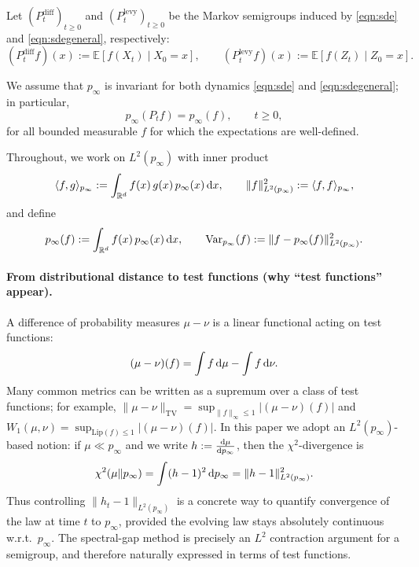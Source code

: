 \begin{definition}
    Let $(P_t^{\mathrm{diff}})_{t\ge 0}$ and $(P_t^{\mathrm{levy}})_{t\ge 0}$ be the Markov semigroups induced by
\eqref{eqn:sde} and \eqref{eqn:sdegeneral}, respectively:
\[
(P_t^{\mathrm{diff}}f)(x):=\mathbb{E}[f(X_t)\mid X_0=x],
\qquad
(P_t^{\mathrm{levy}}f)(x):=\mathbb{E}[f(Z_t)\mid Z_0=x].
\]
\end{definition}

We assume that $p_\infty$ is invariant for both dynamics \eqref{eqn:sde} and \eqref{eqn:sdegeneral}; in particular,
\begin{equation}\label{eq:pinfty_invariant}
p_\infty(P_t f)=p_\infty(f),\qquad t\ge 0,
\end{equation}
for all bounded measurable $f$ for which the expectations are well-defined.

Throughout, we work on $L^2(p_\infty)$ with inner product
\[
\langle f,g\rangle_{p_\infty}:=\int_{\mathbb{R}^d} f(x)\,g(x)\,p_\infty(x)\,\mathrm{d} x,
\qquad
\|f\|_{L^2(p_\infty)}^2:=\langle f,f\rangle_{p_\infty},
\]
and define
\[
p_\infty(f):=\int_{\mathbb{R}^d} f(x)\,p_\infty(x)\,\mathrm{d} x,
\qquad
\mathrm{Var}_{p_\infty}(f):=\|f-p_\infty(f)\|_{L^2(p_\infty)}^2.
\]

\paragraph{From distributional distance to test functions (why ``test functions'' appear).}
A difference of probability measures $\mu-\nu$ is a linear functional acting on test functions:
\[
(\mu-\nu)(f)=\int f\,\mathrm{d}\mu-\int f\,\mathrm{d}\nu.
\]
Many common metrics can be written as a supremum over a class of test functions; for example,
$\|\mu-\nu\|_{\mathrm{TV}}=\sup_{\|f\|_\infty\le 1}|(\mu-\nu)(f)|$ and
$W_1(\mu,\nu)=\sup_{\mathrm{Lip}(f)\le 1}|(\mu-\nu)(f)|$.
In this paper we adopt an $L^2(p_\infty)$-based notion: if $\mu\ll p_\infty$ and we write
$h:=\frac{\mathrm{d}\mu}{\mathrm{d} p_\infty}$, then the $\chi^2$-divergence is
\[
\chi^2(\mu\|p_\infty)=\int (h-1)^2\,\mathrm{d} p_\infty=\|h-1\|_{L^2(p_\infty)}^2.
\]
Thus controlling $\|h_t-1\|_{L^2(p_\infty)}$ is a concrete way to quantify convergence of the law at time $t$ to
$p_\infty$, provided the evolving law stays absolutely continuous w.r.t.\ $p_\infty$. The spectral-gap method is
precisely an $L^2$ contraction argument for a semigroup, and therefore naturally expressed in terms of test functions.


